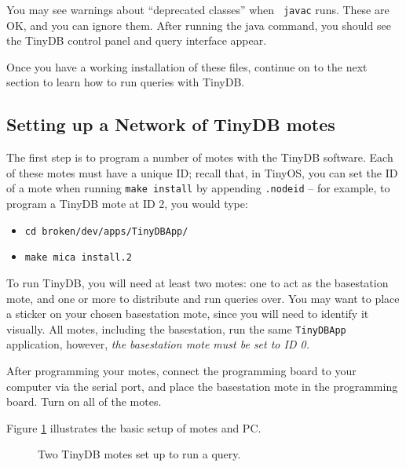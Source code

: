 \documentclass[11pt]{article}
\newcommand{\docroot}{broken/dev}
\begin{document}
\noindent You may see warnings about ``deprecated classes'' when {\tt
javac} runs.  These are OK, and you can ignore them.  After running
the java command, you should see the TinyDB control
panel and query interface appear.

Once you have a working installation of these files, continue on to the next section
to learn how to run queries with TinyDB.

\subsection{Setting up a Network of TinyDB motes}

The first step is to program a number
of motes with the TinyDB software.  Each of these motes must have a unique ID;  recall that,
in TinyOS, you can set the ID of a mote when running {\tt make install} by appending {\tt .nodeid}
-- for example, to program a TinyDB mote at ID 2, you would type:

\begin{itemize}
\item {\tt cd \docroot/apps/TinyDBApp/}
\item {\tt make mica install.2}
\end{itemize}

\noindent To run TinyDB, you will need at least two
motes: one to act as the basestation
mote, and one or more to distribute and run queries
over.  You may want to place a sticker on your chosen basestation
mote, since you will need to identify it visually. All
motes, including the basestation, run
the same {\tt TinyDBApp} application, however, {\it the
basestation mote must be set to ID 0.}

After programming your motes, connect the programming
board to your computer via the serial
port, and place the basestation mote in the programming
board.  Turn on all of the motes.

Figure \ref{fig:setup} illustrates the basic setup of motes and PC.  

\begin{figure}[h]
\centering\leavevmode{}
\caption{Two TinyDB motes set up to run a query.}
\label{fig:setup}
\end{figure}
\end{document}
